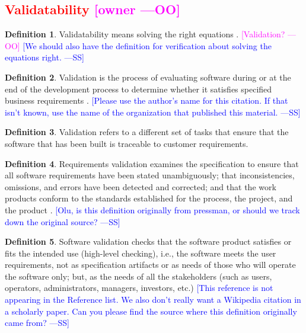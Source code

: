\documentclass[letterpaper,cleveref]{lipics-v2019}
\newcommand{\authornote}[3]{\textcolor{#1}{[#3 ---#2]}}
\newcommand{\authornote}[3]{}
\newcommand{\wss}[1]{\authornote{blue}{SS}{#1}} %
\newcommand{\oo}[1]{\authornote{magenta}{OO}{#1}} %
\newcommand{\notdone}[1]{\textcolor{red}{#1}}
\theoremstyle{definition}
\newtheorem{defn}{Definition}
\begin{document}
\subsection{\notdone{Validatability} \oo{owner}}

\begin{defn}
  Validatability means solving the right equations \citep[p.~23]{Roache1998}.
  \oo{Validation?}  \wss{We should also have the definition for verification
    about solving the equations right.}
\end{defn}

\begin{defn} \label{Validatability_Selected} 
  Validation is the process of evaluating software during or at the end of the
  development process to determine whether it satisfies specified business
  requirements \citep{softwaretestingfundamentals}.  \wss{Please use the
    author's name for this citation.  If that isn't known, use the name of the
    organization that published this material.}
\end{defn}

\begin{defn}
  Validation refers to a different set of tasks that ensure that the software
  that has been built is traceable to customer requirements.
\end{defn}

\begin{defn}
  Requirements validation examines the specification to ensure that all software
  requirements have been stated unambiguously; that inconsistencies, omissions,
  and errors have been detected and corrected; and that the work products
  conform to the standards established for the process, the project, and the
  product \citep{pressman2005software}.  \wss{Olu, is this definition
    originally from pressman, or should we track down the original source?}
\end{defn}

\begin{defn}
  Software validation checks that the software product satisfies or fits the
  intended use (high-level checking), i.e., the software meets the user
  requirements, not as specification artifacts or as needs of those who will
  operate the software only; but, as the needs of all the stakeholders (such as
  users, operators, administrators, managers, investors, etc.)
   \wss{This reference is not appearing in the Reference
    list.  We also don't really want a Wikipedia citation in a scholarly paper.
    Can you please find the source where this definition originally came from?}
\end{defn}
\end{document}
